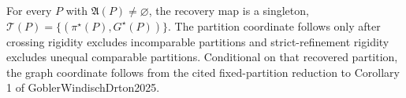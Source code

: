 For every \(P\) with \(\mathfrak A(P)\neq\varnothing\), the recovery map is a singleton, \(\mathcal T(P)=\{(\pi^\star(P),G^\star(P))\}\). The partition coordinate follows only after crossing rigidity excludes incomparable partitions and strict-refinement rigidity excludes unequal comparable partitions. Conditional on that recovered partition, the graph coordinate follows from the cited fixed-partition reduction to Corollary 1 of GoblerWindischDrton2025.